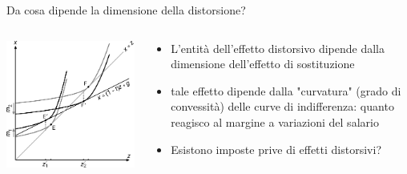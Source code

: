 \documentclass[11pt]{beamer}
\begin{document}
\begin{frame}{Da cosa dipende la dimensione della distorsione?}
\begin{columns}
\begin{column}{.55\columnwidth}
\begin{center}
\includegraphics[width=\textwidth]{./figure/effetto-distorsivo-imposte-ql-8.pdf}
\end{center}
\end{column}


\begin{column}{.45\columnwidth}
\begin{itemize}
\item L'entità dell'effetto distorsivo dipende dalla dimensione dell'effetto di sostituzione
\item tale effetto dipende dalla "curvatura" (grado di convessità) delle curve di indifferenza: quanto reagisco al margine a variazioni del salario
\item Esistono imposte prive di effetti distorsivi?
\end{itemize}
\end{column}
\end{columns}
\end{frame}
\end{document}
